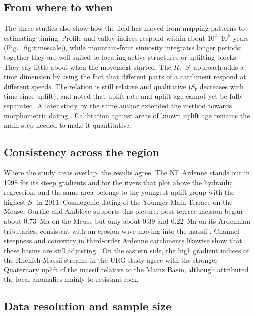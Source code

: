 \documentclass[10pt,a4paper,twocolumn]{article}
\begin{document}
\subsection{From where to when}

The three studies also show how the field has moved from mapping patterns to estimating timing.
Profile and valley indices respond within about $10^4$--$10^5$ years (Fig.~\ref{fig:timescale}),
while mountain-front sinuosity integrates longer periods; together they are well suited to locating
active structures or uplifting blocks. They say little about when the
movement started. The $R_1$--$S_\mathrm{r}$ approach adds a time dimension by using the fact that
different parts of a catchment respond at different speeds. The relation is still relative and
qualitative ($S_\mathrm{r}$ decreases with time since uplift), and \citet{Demoulin2011} noted that uplift
rate and uplift age cannot yet be fully separated. A later study by the same author extended the method
towards morphometric dating \citep{Demoulin2012}. Calibration against areas of known uplift age remains
the main step needed to make it quantitative.

\subsection{Consistency across the region}

Where the study areas overlap, the results agree. The NE Ardenne stands out in 1998 for its steep
gradients and for the rivers that plot above the hydraulic regression, and the same area belongs to the
youngest-uplift group with the highest $S_\mathrm{r}$ in 2011. Cosmogenic dating of the Younger Main
Terrace on the Meuse, Ourthe and Amblève supports this picture: post-terrace incision began about
0.73~Ma on the Meuse but only about 0.39 and 0.22~Ma on its Ardennian tributaries, consistent with an
erosion wave moving into the massif \citep{Rixhon2011}. Channel steepness and convexity in third-order
Ardenne catchments likewise show that these basins are still adjusting \citep{SougnezVanacker2011}. On
the eastern side, the high gradient indices of the Rhenish Massif streams in the URG study agree with
the stronger Quaternary uplift of the massif relative to the Mainz Basin, although
\citet{PetersVanBalen2007} attributed the local anomalies mainly to resistant rock.

\subsection{Data resolution and sample size}
\end{document}

